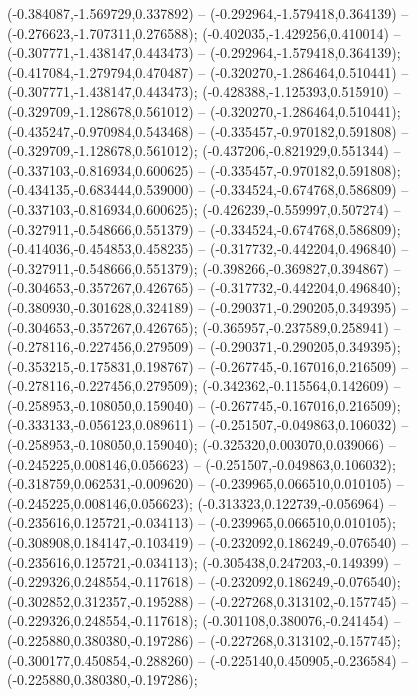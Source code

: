  (-0.384087,-1.569729,0.337892) -- (-0.292964,-1.579418,0.364139) -- (-0.276623,-1.707311,0.276588);
 (-0.402035,-1.429256,0.410014) -- (-0.307771,-1.438147,0.443473) -- (-0.292964,-1.579418,0.364139);
 (-0.417084,-1.279794,0.470487) -- (-0.320270,-1.286464,0.510441) -- (-0.307771,-1.438147,0.443473);
 (-0.428388,-1.125393,0.515910) -- (-0.329709,-1.128678,0.561012) -- (-0.320270,-1.286464,0.510441);
 (-0.435247,-0.970984,0.543468) -- (-0.335457,-0.970182,0.591808) -- (-0.329709,-1.128678,0.561012);
 (-0.437206,-0.821929,0.551344) -- (-0.337103,-0.816934,0.600625) -- (-0.335457,-0.970182,0.591808);
 (-0.434135,-0.683444,0.539000) -- (-0.334524,-0.674768,0.586809) -- (-0.337103,-0.816934,0.600625);
 (-0.426239,-0.559997,0.507274) -- (-0.327911,-0.548666,0.551379) -- (-0.334524,-0.674768,0.586809);
 (-0.414036,-0.454853,0.458235) -- (-0.317732,-0.442204,0.496840) -- (-0.327911,-0.548666,0.551379);
 (-0.398266,-0.369827,0.394867) -- (-0.304653,-0.357267,0.426765) -- (-0.317732,-0.442204,0.496840);
 (-0.380930,-0.301628,0.324189) -- (-0.290371,-0.290205,0.349395) -- (-0.304653,-0.357267,0.426765);
 (-0.365957,-0.237589,0.258941) -- (-0.278116,-0.227456,0.279509) -- (-0.290371,-0.290205,0.349395);
 (-0.353215,-0.175831,0.198767) -- (-0.267745,-0.167016,0.216509) -- (-0.278116,-0.227456,0.279509);
 (-0.342362,-0.115564,0.142609) -- (-0.258953,-0.108050,0.159040) -- (-0.267745,-0.167016,0.216509);
 (-0.333133,-0.056123,0.089611) -- (-0.251507,-0.049863,0.106032) -- (-0.258953,-0.108050,0.159040);
 (-0.325320,0.003070,0.039066) -- (-0.245225,0.008146,0.056623) -- (-0.251507,-0.049863,0.106032);
 (-0.318759,0.062531,-0.009620) -- (-0.239965,0.066510,0.010105) -- (-0.245225,0.008146,0.056623);
 (-0.313323,0.122739,-0.056964) -- (-0.235616,0.125721,-0.034113) -- (-0.239965,0.066510,0.010105);
 (-0.308908,0.184147,-0.103419) -- (-0.232092,0.186249,-0.076540) -- (-0.235616,0.125721,-0.034113);
 (-0.305438,0.247203,-0.149399) -- (-0.229326,0.248554,-0.117618) -- (-0.232092,0.186249,-0.076540);
 (-0.302852,0.312357,-0.195288) -- (-0.227268,0.313102,-0.157745) -- (-0.229326,0.248554,-0.117618);
 (-0.301108,0.380076,-0.241454) -- (-0.225880,0.380380,-0.197286) -- (-0.227268,0.313102,-0.157745);
 (-0.300177,0.450854,-0.288260) -- (-0.225140,0.450905,-0.236584) -- (-0.225880,0.380380,-0.197286);

